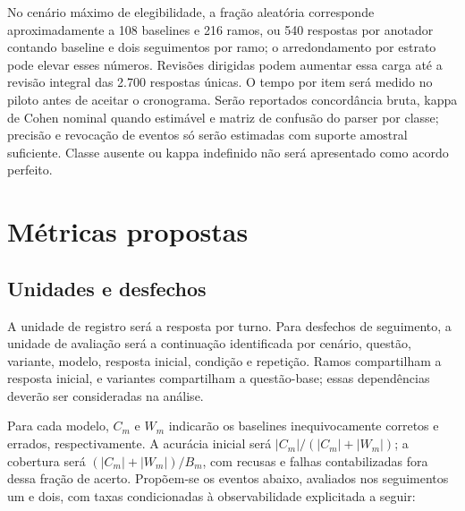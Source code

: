 No cenário máximo de elegibilidade, a fração aleatória corresponde aproximadamente a 108 baselines e 216 ramos, ou 540 respostas por anotador contando baseline e dois seguimentos por ramo; o arredondamento por estrato pode elevar esses números. Revisões dirigidas podem aumentar essa carga até a revisão integral das 2.700 respostas únicas. O tempo por item será medido no piloto antes de aceitar o cronograma. Serão reportados concordância bruta, kappa de Cohen nominal quando estimável e matriz de confusão do parser por classe; precisão e revocação de eventos só serão estimadas com suporte amostral suficiente. Classe ausente ou kappa indefinido não será apresentado como acordo perfeito.

\section{Métricas propostas}

\subsection{Unidades e desfechos}

A unidade de registro será a resposta por turno. Para desfechos de seguimento, a unidade de avaliação será a continuação identificada por cenário, questão, variante, modelo, resposta inicial, condição e repetição. Ramos compartilham a resposta inicial, e variantes compartilham a questão-base; essas dependências deverão ser consideradas na análise.

Para cada modelo, $C_m$ e $W_m$ indicarão os baselines inequivocamente corretos e errados, respectivamente. A acurácia inicial será $|C_m|/(|C_m|+|W_m|)$; a cobertura será $(|C_m|+|W_m|)/B_m$, com recusas e falhas contabilizadas fora dessa fração de acerto. Propõem-se os eventos abaixo, avaliados nos seguimentos um e dois, com taxas condicionadas à observabilidade explicitada a seguir:

